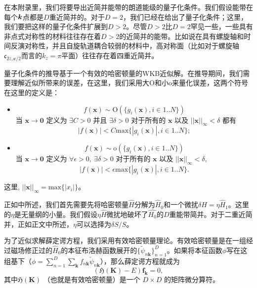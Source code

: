 在本附录里，我们将要导出近简并能带的朗道能级的量子化条件。我们假设能带在每个$\boldsymbol{k}$点都是$D$重近简并的。对于$D=2$，我们已经在给出了量子化条件；这里，我们要把这样的量子化条件扩展到$D>2$。尽管$D>2$比$D=2$罕见一些，一些具有非点式对称性的材料往往存在着$D>2$的近简并的能带。比如说在具有螺旋轴和时间反演对称性，并且自旋轨道耦合较弱的材料中，高对称面（比如对于螺旋轴$\mathfrak{c}_{2z,\boldsymbol{c}/2}$而言的$k_z=\pi$平面）往往存在着四重近简并。

量子化条件的推导基于一个有效的哈密顿量的WKB近似解。在推导期间，我们需要理解近似所带来的误差，在这里，我们采用大O和小o来量化误差，这两个符号在这里的定义是： 
\begin{itemize}
    \item 
    \begin{equation}
        f(\boldsymbol{x})\sim\text{O}(\{g_i(\boldsymbol{x}), i\in 1..N\})
    \end{equation}
    当 $\boldsymbol{x}\to\boldsymbol{0}$ 定义为 $\exists C>0$ 并且 $\exists \delta>0$ 对于所有的 $\boldsymbol{x}$ 以及 $||\boldsymbol{x}||_\infty<\delta$ 都有
    \begin{equation}
        |f(\boldsymbol{x})|<C\text{max}\{|g_i(\boldsymbol{x})|, i\in 1..N\};
    \end{equation}
    \item 
    \begin{equation}
        f(\boldsymbol{x})\sim\text{o}(\{g_i(\boldsymbol{x}), i\in 1..N\})
    \end{equation}
    当 $\boldsymbol{x}\to\boldsymbol{0}$ 定义为 $\forall \epsilon>0,~\exists \delta>0$ 对于所有的 $\boldsymbol{x}$ 以及 $||\boldsymbol{x}||_\infty<\delta$,
    \begin{equation}
        |f(\boldsymbol{x})|<\epsilon\text{max}\{|g_i(\boldsymbol{x})|, i\in 1..N\}.
    \end{equation}
\end{itemize}
这里, $||\boldsymbol{x}||_\infty=\text{max}\{|x_i|\}$。

正如中所述，我们首先需要先将哈密顿量$\hat{H}$分解为$\hat{H}_0$和一个微扰$\delta\hat{H}=\eta\hat{H}_1$。这里的$\eta$是无量纲的小量。我们假设$\eta\hat{H}$微扰地破坏了$\hat{H_0}$的$D$重能带简并。对于二重近简并，正如正文中所述，$\eta$可以选择为$\delta S/S$。

为了近似求解薛定谔方程，我们采用有效哈密顿量理论\cite{rotheffham,100p}。有效哈密顿量是在一组经过磁场修正过的$\hat{H}_0$的本征布洛赫函数展开的\cite{rotheffham}$\{\tilde{\psi}_{n\boldsymbol{k}}\}_{n=1}^D$。如果将本征函数$\phi$写在这组基下（$\phi=\sum_{n=1}^D\sum_{\boldsymbol{k}}f_{n\boldsymbol{k}}\tilde{\psi}_{n\boldsymbol{k}}$），那么薛定谔方程就成为
\begin{equation}
(\mathfrak{H}(\boldsymbol{K})-E)\boldsymbol{f}_{\boldsymbol{k}}=0,\label{eq:schrodinger}
\end{equation}
其中$\mathfrak{H}(\boldsymbol{K})$ （也就是有效哈密顿量）是一个 $D\times D$ 的矩阵微分算符。 

